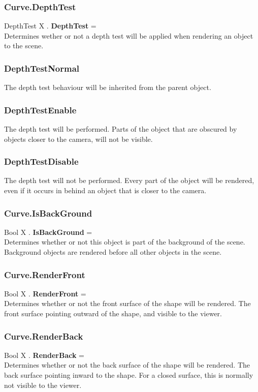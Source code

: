 \subsubsection{Curve.DepthTest \label{F:Curve:DepthTest}}
DepthTest X . \textbf{DepthTest} = \\
Determines wether or not a depth test will be applied when rendering an object to the scene.

\subsubsection{DepthTestNormal \label{T:DepthTest|DepthTestNormal}}
The depth test behaviour will be inherited from the parent object.

\subsubsection{DepthTestEnable \label{T:DepthTest|DepthTestEnable}}
The depth test will be performed. Parts of the object that are obscured by objects closer to the camera, will not be visible.

\subsubsection{DepthTestDisable \label{T:DepthTest|DepthTestDisable}}
The depth test will not be performed. Every part of the object will be rendered, even if it occurs in behind an object that is closer to the camera.

\subsubsection{Curve.IsBackGround \label{F:Curve:IsBackGround}}
Bool X . \textbf{IsBackGround} = \\
Determines whether or not this object is part of the background of the scene. Background objects are rendered before all other objects in the scene.

\subsubsection{Curve.RenderFront \label{F:Curve:RenderFront}}
Bool X . \textbf{RenderFront} = \\
Determines whether or not the front surface of the shape will be rendered. The front surface pointing outward of the shape, and visible to the viewer.

\subsubsection{Curve.RenderBack \label{F:Curve:RenderBack}}
Bool X . \textbf{RenderBack} = \\
Determines whether or not the back surface of the shape will be rendered. The back surface pointing inward to the shape. For a closed surface, this is normally not visible to the viewer.

